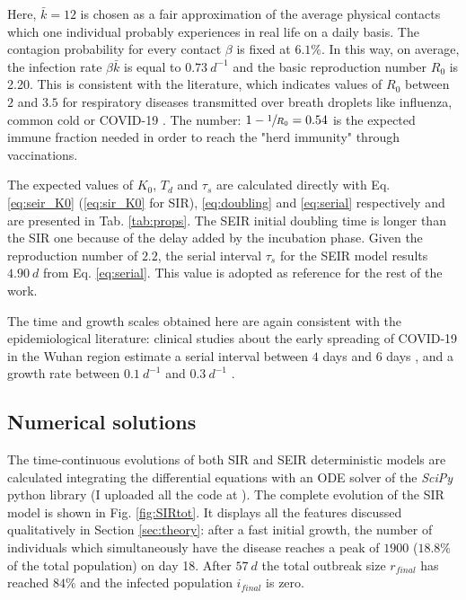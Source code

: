 \documentclass[DIV=12, BCOR=0pt]{scrartcl}  %
\begin{document}
  Here, $\bar{k} = 12$ is chosen as a fair approximation of the average physical contacts which one individual probably experiences in real life on a daily basis. The contagion probability for every contact $\beta$ is fixed at $6.1 \%$. In this way, on average, the infection rate $\beta \bar{k}$ is equal to $0.73 \ d^{-1}$ and the basic reproduction number $R_0$ is 2.20. This is consistent with the literature, which indicates values of $R_0$ between $2$ and $3.5$ for respiratory diseases transmitted over breath droplets like influenza, common cold or COVID-19 \citep{Hilton2020, Sanche2020, Firth2020}. 
  The number: $1 - \sfrac{1}{R_0} = 0.54 $ is the expected immune fraction needed in order to reach the "herd immunity" through vaccinations.
  
  The expected values of $K_0$, $T_d$ and $\tau_s$ are calculated directly with Eq. \ref{eq:seir_K0} (\ref{eq:sir_K0} for SIR), \ref{eq:doubling} and \ref{eq:serial} respectively and are presented in Tab. \ref{tab:props}. The SEIR initial doubling time is longer than the SIR one because of the delay added by the incubation phase. Given the reproduction number of $2.2$, the serial interval $\tau_s$ for the SEIR model results $4.90 \ d$ from Eq. \ref{eq:serial}. This value is adopted as reference for the rest of the work.
  
  The time and growth scales obtained here are again consistent with the epidemiological literature: clinical studies about the early spreading of COVID-19 in the Wuhan region estimate a serial interval between $4$ days \citep{Du2020} and $6$ days \citep{Firth2020}, and a growth rate between $0.1 \ d^{-1}$ \citep{Du2020} and $0.3 \ d^{-1}$ \citep{Sanche2020}.
    
  
  \subsection{Numerical solutions}
	The time-continuous evolutions of both SIR and SEIR deterministic models are calculated integrating the differential equations with an ODE solver of the \textit{SciPy} python library (I uploaded all the code at \citet{pyndemic}).
	The complete evolution of the SIR model is shown in Fig. \ref{fig:SIRtot}. It displays all the features discussed qualitatively in Section \ref{sec:theory}: after a fast initial growth, the number of individuals which simultaneously have the disease reaches a peak of $1900$ ($18.8 \%$ of the total population) on day 18. After $57 \ d$ the total outbreak size $r_{final}$ has reached $84 \%$ and the infected population $i_{final}$ is zero.
	
\end{document}
